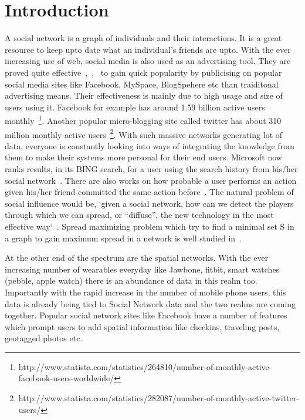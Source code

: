 \section{Introduction}
A social network is a graph of individuals and their interactions. It is a great resource to keep upto date what an individual's friends are upto. With the ever increasing use of web, social media is also used as an advertising tool. They are proved quite effective~\cite{F1969},~\cite{JP1987},~\cite{PM2001} to gain quick popularity by publicising on popular social media sites like Facebook, MySpace, BlogSpehere etc than traiditonal advertising means. Their effectiveness is mainly due to high usage and size of users using it. Facebook for example has around 1.59 billion active users monthly~\footnote{http://www.statista.com/statistics/264810/number-of-monthly-active-facebook-users-worldwide/}. Another popular micro-blogging site called twitter has about 310 million monthly active users~\footnote{http://www.statista.com/statistics/282087/number-of-monthly-active-twitter-users/}. With such massive networks generating lot of data, everyone is constantly looking into ways of integrating the knowledge from them to make their systems more personal for their end users. Microsoft now ranks results, in its BING search, for a user using the search history from his/her social network~\cite{M2011}. There are also works on how probable a user performs an action given his/her friend committed the same action before~\cite{DJE2003}. The natural problem of social influence would be, `given a social network, how can we detect the players through which we can spread, or “diffuse”, the new technology in the most effective way`~\cite{EA2007}. Spread maximizing problem which try to find a minimal set S in a graph to gain maximum spread in a network is well studied in~\cite{MP2002}.

At the other end of the spectrum are the spatial networks. With the ever increasing number of wearables everyday like Jawbone, fitbit, smart watches (pebble, apple watch) there is an abundance of data in this realm too. Importantly with the rapid increase in the number of mobile phone users, this data is already being tied to Social Network data and the two realms are coming together. Popular social network sites like Facebook have a number of features which prompt users to add spatial information like checkins, traveling posts, geotagged photos etc.

